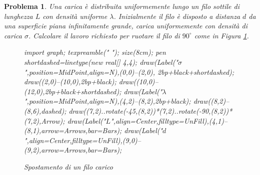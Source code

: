 \documentclass[b5paper,twoside]{book}
\newtheorem{problema}{Problema}
\let\oldhat\hat
\renewcommand{\vec}[1]{\mathbf{#1}}
\renewcommand{\hat}[1]{\widehat{\mathbf{#1}}}
\begin{document}
\begin{problema}
	Una carica è distribuita uniformemente lungo un filo sottile di lunghezza
	$L$ con densità uniforme $\lambda$. Inizialmente il filo è disposto a distanza
	$d$ da una superficie piana infinitamente grande, carica uniformemente con
	densità di carica $\sigma$. Calcolare il lavoro richiesto per ruotare il filo di
	$90^{\circ}$ come in Figura \ref{fig:spostamento_filo}.
	\begin{figure}
		\centering
		\begin{asy}
			import graph;
			texpreamble("\let\oldhat\hat
			\renewcommand{\vec}[1]{\mathbf{#1}}
			\renewcommand{\hat}[1]{\oldhat{\mathbf{#1}}}");
			size(8cm);
			pen shortdashed=linetype(new real[] {4,4});
			draw(Label("$\sigma$",position=MidPoint,align=N),(0,0)--(2,0),
			2bp+black+shortdashed);
			draw((2,0)--(10,0),2bp+black);
			draw((10,0)--(12,0),2bp+black+shortdashed);
			draw(Label("$\lambda$",position=MidPoint,align=N),(4,2)--(8,2),2bp+black);
			draw((8,2)--(8,6),dashed);
			draw((7,2)..rotate(-45,(8,2))*(7,2)..rotate(-90,(8,2))*(7,2),Arrow);
			draw(Label("$L$",align=Center,filltype=UnFill),(4,1)--(8,1),arrow=Arrows,bar=Bars);
			draw(Label("$d$",align=Center,filltype=UnFill),(9,0)--(9,2),arrow=Arrows,bar=Bars);
		\end{asy}
		\caption{Spostamento di un filo carico}
		\label{fig:spostamento_filo}
	\end{figure}
\end{problema}
\end{document}
